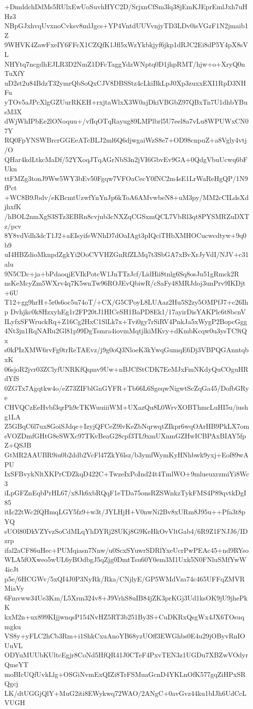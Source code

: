 +DmddchDdMs5RUlxEwUoSuvhHYC2D/SrjxnCfSm3lq38jEmKJEprEmlJxh7uHHz3
NBpGJxhvqUvxnoCvksv8mlJgcs+YP4VntdUUVvnjyTD3LDv0isVGzF1N2jmaib1Z
9WHVK4ZawFxeIY6FFcX1CZQfK1Jfl5xWzYkbkjyf6jkp1dRJC2Ei8dP5Y4pX8sVL
NHYtq7ncgdhEJLR3D2NmZ1DFcTaggYdzWNptq0D1jhpRMT/hjw+o+XryQ0nTuXfY
uD2st2u84BdzT32ymrQbSoQxCJV8DBSStz4cLkiBkLpJ0Xp3zuxxEXI1RpD3NHFu
yTOv5aJPcXlgGZUurRKEH+rxjtaWlxX3W0ajDkiVBGbZ97QBxTn7U1dhbYBusM3X
dWjWhIPbEe2lONoquu+/vfIqOTqRayug89LMPlbrl5U7eel8a7vLu8WPUWxCN07Y
RQ0FpYNSWBrcrGGEeATcBLJ2ml6Q6djwgaiWzS8e7+OD98cnpuZ+a8Vgly4vtj/O
QHar4kdLtkcMaDf/52YXoqJTqAGrNbS3n2jVI6GbvEv9GA+0QdgVbuUcwq6bFUkn
ttFMZg3tonJ9Ww5WY3bEv50Fgqw7VFOaCecY0fNC2m4sE1LrWaReHgQP/1N9fPct
+WC8B9Jbdv/eKBcmtUzwfYnYnJp6kToA6AMvwbeN8+uM3py/MM2cCILdsXdjhxfK
/hBOL2nmXgS3STz3EBRn8cvjub3cNXZqCGSxmQCL7VbRl3qt8PYSMRZuDXTz/pcv
8Y8vdVdh3dcT1J2+aEIsyifeWNhD7dOaIAgt3pIQciTHbXMHOCucwcdtyw+9q0b9
uI4HBZdioMknpdZgkYi2OoCVVHZGnRfZLMq7t3SbGA7xBvXrJyVdI/NJV+c31alu
9N5CDc+ja+bPdaoqjEVIkPotcW1JnTTzJcf/LidHii8tnlg6Sq8osJu51gRmck2R
nsKeMcyZm5WXrv4q7K5wnTw96ROJEvQbiwR/cSaFy48MRJdoj3unPrv9IKDjt+6U
T12+gg9hrH+5r0s6oc5u74oT/+CX/G5CPoyL8LUAaz2Hu5S2zy5OMPfJ7+c26Ihp
Dvhjkc0k8HzxyhEg1r2FP20tJ1HICeSH1BaPD8Ek1/17ayirDisYAKPlc6t8bcnV
ILyfxSFWruckRq+Z16Cg2HxC1SlLk7x+Tvi0gy7rSiRV4PnkJa5xWygP2BopcGgg
4Nt3jn1RqNARu2Gl81p99DgTsmra4iovmMqtjlkiMKvy+dKmbKcqw0u3ysTC9iQx
s0kPIzXMW6rvFg0trReTAEvz/j9g0oQ3NloeK3kYwqGumqE6Dj3VBPQGAnntqbxK
06sjoR2jvr03ZClyfUNRKfQqmv9Uw+nBJCfStCDK7EeMJxFmNKdyQuCOguHRdYfS
0ZGTx7Agqtkw4o/eZ73ZIFblGnGYFR+Tb66L6SgeqwNigwtScZqGa45/DofbGRye
CHVQCzEeHvbf3qrPh9cTKWuuiiiWM+UXazQu8L0WrvXOBThmcLuHI5u/iushg1LA
Z5GBqC6l7ux8GoiSJdqe+IzyjQFCeZ9lvKeZbNqrwqtZIkpr6wqOArHB9PkLX7om
eVOZDmfGHtG8eSWXc97TKvBeaG28cpf3TL9xmUXnmGZHwICBPAxBIAY5fpZ+QSJB
GtMR2AAUBR9iu0b2ddb2VcFl47ZkY6lsz/b3ymfWymKyHNhbwk9yxj+Eof89wAPU
IxSFBvykNltXKPrCDZkqD422C+TwzeIxPoInd24t4TmlWO+9mlueuxrzmiYi8Wc3
iLpGFZnEqbPrHL67/x8Jk6xbRQqF1eTDa75onsRZSWnkzTykFMS4P89qvtkDgI85
itIc22tWc2fQHmqLGY5fz9+w3t/JYLHjH+V0nwNi2Bv8xURm8J95u++Pfa3t8pYQ
sUOl80DkVZYvzSoCdMLqYhDYRj28UKj8G9KeHkOvVltGab4/6R9Z1FNJJ6/IDzrp
ifal2aCF86uHec+PUMqiasn7Nnw/u0ScxSYuwrSDRlYxeUcrPwPEAc45+nd9RYso
WLA5fOXweo5wUL6yBOdbgJ5qZjg0DmtTsu60Y0em3M1Uxk5N0FNluSMfYwW4icJt
p5e/6HCGWv/5xQI4J0P3NyRk/Rka/CNjlyE/GP5WMdVza74c465UFFqZMVRMiaVy
6Fmvww34Ue3Km/L5Xrm324v8+J9VrhS8uIB84jZK3prKGj3Ud1ksOK9jU9jhePkK
kxM2n+ux899KIjjwnqsP154NvHZ5RT3b251By3S+CuDKRxQsgWx4JX6TOsuqmgku
VS8y+yFLC2hCb3Rm+i1ShkCxuAnoYB68yzUOff3EWGhbs0E4u29jOByvRnIOUuVL
ODYuMUUbKUltcEgjr8CoNd5HfQR41J0CTeF4PxvTEN3z1UGDu7XBZwVOdyrQmeYT
moBIcUQfUvkLlg+OSGiNvmExQIZi8TrFSMuaGcnD4YKLnOfK577gqZiHPxSRQgcj
LK/dtUGGjQlY+MuG2iti8EWykwq72WAO/2ANgC+0avGvz44ku1bIJh6UdCcLVUGH
